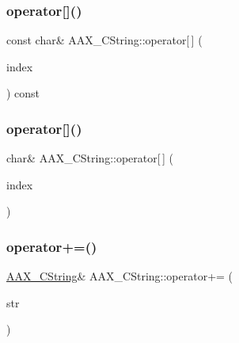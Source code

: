 \mbox{\label{a01573_a018ed265c2c0ddb6d5ba9ac6d17bd82f}} 
\subsubsection{\texorpdfstring{operator[]()}{operator[]()}\hspace{0.1cm}{\footnotesize\ttfamily [1/2]}}
{\footnotesize\ttfamily const char\& A\+A\+X\+\_\+\+C\+String\+::operator\mbox{[}$\,$\mbox{]} (\begin{DoxyParamCaption}\item[{uint32\+\_\+t}]{index }\end{DoxyParamCaption}) const}

\mbox{\label{a01573_ac27c664f0dcca1d36e516b3678763e07}} 
\subsubsection{\texorpdfstring{operator[]()}{operator[]()}\hspace{0.1cm}{\footnotesize\ttfamily [2/2]}}
{\footnotesize\ttfamily char\& A\+A\+X\+\_\+\+C\+String\+::operator\mbox{[}$\,$\mbox{]} (\begin{DoxyParamCaption}\item[{uint32\+\_\+t}]{index }\end{DoxyParamCaption})}

\mbox{\label{a01573_a38c818c2719546d7060504b586a38ab9}} 
\subsubsection{\texorpdfstring{operator+=()}{operator+=()}\hspace{0.1cm}{\footnotesize\ttfamily [1/3]}}
{\footnotesize\ttfamily \mbox{\hyperlink{a01573}{A\+A\+X\+\_\+\+C\+String}}\& A\+A\+X\+\_\+\+C\+String\+::operator+= (\begin{DoxyParamCaption}\item[{const \mbox{\hyperlink{a01573}{A\+A\+X\+\_\+\+C\+String}} \&}]{str }\end{DoxyParamCaption})}

